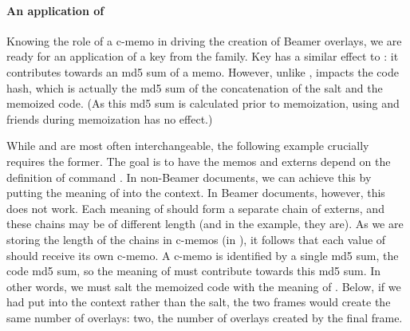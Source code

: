 \documentclass[a4paper,11pt]{article}
\begin{document}
\paragraph{An application of }

Knowing the role of a c-memo in driving the creation of Beamer overlays, we are
ready for an application of a key from the  family.  Key
 has a similar effect to : it contributes towards
an md5 sum of a memo.  However, unlike ,  impacts
the code hash, which is actually the md5 sum of the concatenation of the salt
and the memoized code.  (As this md5 sum is calculated prior to memoization, 
using  and friends during memoization has no effect.)

While  and  are most often interchangeable, the
following example crucially requires the former.  The goal is to have the memos
and externs depend on the definition of command .  In non-Beamer
documents, we can achieve this by putting the meaning of  into the
context.  In Beamer documents, however, this does not work.  Each meaning of
 should form a separate chain of externs, and these chains may be of
different length (and in the example, they are).  As we are storing the length
of the chains in c-memos (in ), it follows that
each value of  should receive its own c-memo.  A c-memo is identified by
a single md5 sum, the code md5 sum, so the meaning of  must contribute
towards this md5 sum.  In other words, we must salt the memoized code with the
meaning of .  Below, if we had put  into the context rather than 
the salt, the two frames would create the same number of overlays: two, the 
number of overlays created by the final frame.


\end{document}
